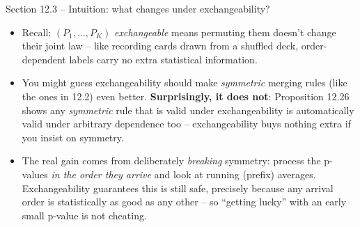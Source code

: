 \documentclass[aspectratio=169,10pt]{beamer}
\begin{document}
\begin{frame}{Section 12.3 -- Intuition: what changes under exchangeability?}
  \begin{itemize}
    \item Recall: $(P_1,\dots,P_K)$ \emph{exchangeable} means permuting them doesn't change their joint law -- like recording cards drawn from a shuffled deck, order-dependent labels carry no extra statistical information.
    \item You might guess exchangeability should make \emph{symmetric} merging rules (like the ones in 12.2) even better. \textbf{Surprisingly, it does not}: Proposition 12.26 shows any \emph{symmetric} rule that is valid under exchangeability is automatically valid under arbitrary dependence too -- exchangeability buys nothing extra if you insist on symmetry.
    \item The real gain comes from deliberately \emph{breaking} symmetry: process the p-values \emph{in the order they arrive} and look at running (prefix) averages. Exchangeability guarantees this is still safe, precisely because any arrival order is statistically as good as any other -- so ``getting lucky'' with an early small p-value is not cheating.
  \end{itemize}
\end{frame}
\end{document}
